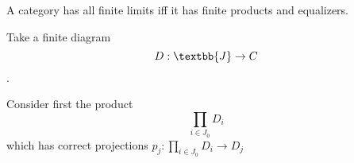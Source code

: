 \begin{Theorem}

  A category has all finite limits iff it has finite products and equalizers.

  \begin{Proof}
    Take a finite diagram
    $$ D : \textbb{J} \rightarrow C $$.

    Consider first the product
    $$ \prod_{i \in J_0} D_i $$
    which has correct projections $ p_j : \prod_{i \in J_0} D_i \rightarrow D_j  $
    \end{Proof}
  
\end{Theorem}

